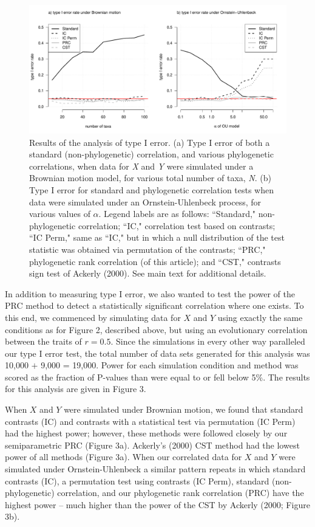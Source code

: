 \documentclass[fleqn,10pt,lineno]{wlpeerj} %
\begin{document}
\begin{figure}
\includegraphics[width=1\linewidth]{Harmon-and-Revell_NonParametricPCM.PeerJ_files/figure-latex/Harmon-fig2-1} \caption{Results of the analysis of type I error. (a) Type I error of both a standard (non-phylogenetic) correlation, and various phylogenetic correlations, when data for \emph{X} and \emph{Y} were simulated under a Brownian motion model, for various total number of taxa, \emph{N}. (b) Type I error for standard and phylogenetic correlation tests when data were simulated under an Ornstein-Uhlenbeck process, for various values of $\alpha$. Legend labels are as follows: ``Standard," non-phylogenetic correlation; ``IC," correlation test based on contrasts; ``IC Perm," same as ``IC," but in which a null distribution of the test statistic was obtained via permutation of the contrasts; ``PRC," phylogenetic rank correlation (of this article); and ``CST," contrasts sign test of Ackerly (2000). See main text for additional details.}\label{fig:Harmon-fig2}
\end{figure}

In addition to measuring type I error, we also wanted to test the power of the PRC method to detect a statistically significant correlation where one exists. To this end, we commenced by simulating data for \(X\) and \(Y\) using exactly the same conditions as for Figure 2, described above, but using an evolutionary correlation between the traits of \(r = 0.5\). Since the simulations in every other way paralleled our type I error test, the total number of data sets generated for this analysis was 10,000 \(+\) 9,000 = 19,000. Power for each simulation condition and method was scored as the fraction of P-values than were equal to or fell below 5\%. The results for this analysis are given in Figure 3.

When \(X\) and \(Y\) were simulated under Brownian motion, we found that standard contrasts (IC) and contrasts with a statistical test via permutation (IC Perm) had the highest power; however, these methods were followed closely by our semiparametric PRC (Figure 3a). Ackerly's (2000) CST method had the lowest power of all methods (Figure 3a). When our correlated data for \(X\) and \(Y\) were simulated under Ornstein-Uhlenbeck a similar pattern repeats in which standard contrasts (IC), a permutation test using contrasts (IC Perm), standard (non-phylogenetic) correlation, and our phylogenetic rank correlation (PRC) have the highest power -- much higher than the power of the CST by Ackerly (2000; Figure 3b).
\end{document}
